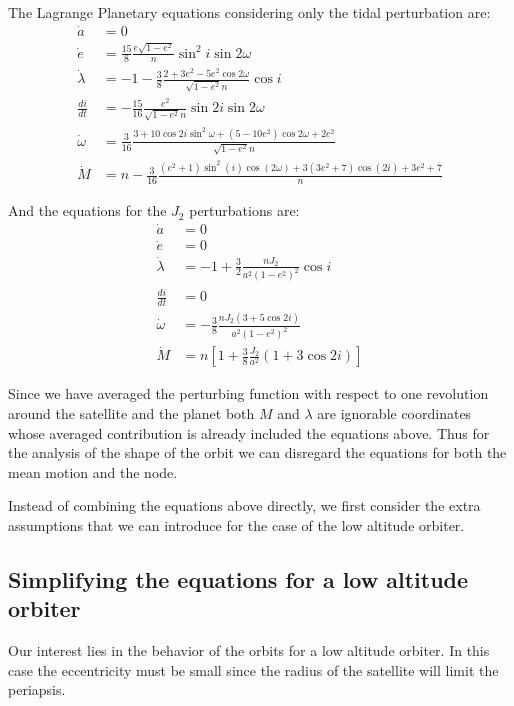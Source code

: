 The Lagrange Planetary equations considering only the tidal perturbation are:
\begin{align}
\dot{a} &= 0\\
\dot{e} &= \frac{15}{8} \frac{e \sqrt{1-e^2}}{n} \sin^2 i \sin 2\omega \\
\dot{\lambda} &=-1 - \frac{3}{8} \frac{2 + 3 e^2 -5 e^2 \cos 2 \omega }{\sqrt{1-e^2} n} \cos i \\
\frac{di}{dt} &= -\frac{15}{16} \frac{e^2 }{\sqrt{1-e^2} n} \sin 2i \sin 2\omega\\
\dot{\omega} &= \frac{3}{16} \frac{3 +10 \cos 2i \sin^2 \omega + \left(5-10 e^2\right) \cos 2 \omega +2 e^2}{\sqrt{1-e^2} n} \\
\dot{M} &= n-\frac{3}{16} \frac{\left(e^2+1\right) \sin ^2(i) \cos (2 \omega )+3 \left(3 e^2+7\right) \cos (2 i)+3 e^2+7}{n}
\end{align}

And the equations for the $J_2$ perturbations are:
\begin{align}
\dot{a} &= 0\\
\dot{e} &= 0\\
\dot{\lambda} &=- 1+ \frac{3}{2} \frac{n J_2}{a^2 \left(1-e^2\right)^2} \cos i \\
\frac{di}{dt} &= 0\\
\dot{\omega} &= -\frac{3}{8} \frac{n J_2 (3 + 5 \cos 2i)}{a^2 \left(1-e^2\right)^2} \\
\dot{M} &= n \left[1 + \frac{3}{8} \frac{J_2}{a^2} \left( 1+ 3 \cos 2i\right) \right]
\end{align}

Since we have averaged the perturbing function with respect to one revolution around the satellite and the planet both $M$ and $\lambda$ are ignorable coordinates whose averaged contribution is already included the equations above. Thus for the analysis of the shape of the orbit we can disregard the equations for both the mean motion and the node.

Instead of combining the equations above directly, we first consider the extra assumptions that we can introduce for the case of the low altitude orbiter.

\subsection{Simplifying the equations for a low altitude orbiter}
Our interest lies in the behavior of the orbits for a low altitude orbiter. In this case the eccentricity must be small since the radius of the satellite will limit the periapsis. 

